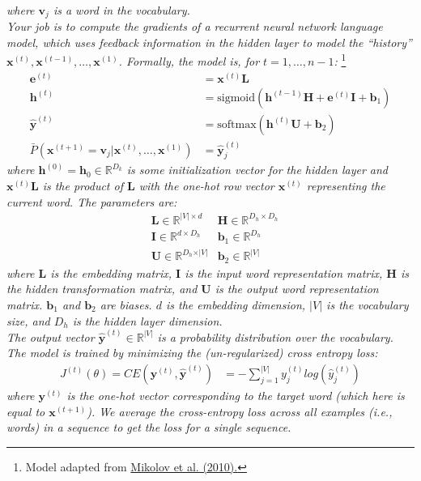 \documentclass[fleqn]{MJD}
\newcommand{\0}{\emptyset}
\begin{document}
\noindent \textit{where $\bm{v}_{j}$ is a word in the vocabulary.} \\

\noindent \textit{Your job is to compute the gradients of a recurrent neural network language model, which uses feedback information in the hidden layer to model the ``history'' $\bm{x}^{(t)}, \bm{x}^{(t-1)}, \dots, \bm{x}^{(1)}$. Formally, the model is, for $t = 1, \dots, n-1$:}%
\footnote{Model adapted from \hyperref{http://www.fit.vutbr.cz/research/groups/speech/publi/2010/mikolov_interspeech2010_IS100722.pdf}{}{}{Mikolov et al. (2010).}} %
%
\begin{align}
	\bm{e}^{(t)} &= \bm{x}^{(t)}\bm{L} \\
	\bm{h}^{(t)} &= \text{sigmoid} \left( \bm{h}^{(t-1)}\bm{H} + \bm{e}^{(t)}\bm{I} + \bm{b}_{1} \right)\\
	\hat{\bm{y}}^{(t)} &= \text{softmax}  \left( \bm{h}^{(t)}\bm{U} + \bm{b}_{2} \right) \\
	\bar{P}\left( \bm{x}^{(t+1)} = \bm{v}_{j} \vert \bm{x}^{(t)}, \dots, \bm{x}^{(1)} \right) &= \hat{\bm{y}}_{j}^{(t)}
\end{align}
%
\noindent \textit{where $\bm{h}^{(0)} = \bm{h}_{0} \in \mathbb{R}^{D_{k}}$ is some initialization vector for the hidden layer and $\bm{x}^{(t)}\bm{L}$ is the product of $\bm{L}$ with the one-hot row vector $\bm{x}^{(t)}$ representing the current word. The parameters are: }
%
\begin{align}
	&\bm{L} \in \mathbb{R}^{\vert V \vert \times d} 
	&\bm{H} \in \mathbb{R}^{D_{h} \times D_{h}} \\ 
	&\bm{I} \in \mathbb{R}^{d \times D_{h}} 
	&\bm{b}_{1} \in \mathbb{R}^{D_{h}} \\ 
	& \bm{U} \in \mathbb{R}^{D_{h} \times \vert V \vert} 
	& \bm{b}_{2} \in \mathbb{R}^{\vert V \vert} 
\end{align}
%
\noindent \textit{where $\bm{L}$ is the embedding matrix, $\bm{I}$ is the input word representation matrix, $\bm{H}$ is the hidden transformation matrix, and $\bm{U}$ is the output word representation matrix. $\bm{b}_{1}$ and $\bm{b}_{2}$ are biases. $d$ is the embedding dimension, $\vert V \vert$ is the vocabulary size, and $D_{h}$ is the hidden layer dimension.} \\

\noindent \textit{The output vector $\hat{\bm{y}}^{(t)} \in \mathbb{R}^{\vert V \vert}$ is a probability distribution over the vocabulary. The model is trained by minimizing the (un-regularized) cross entropy loss:}
%
\begin{align}
	J^{(t)}(\theta) = CE(\bm{y}^{(t)} , \hat{\bm{y}}^{(t)}) &= - \sum_{j=1}^{\vert V \vert} y_{j}^{(t)} log(\hat{y}_{j}^{(t)})
\end{align}
% 
\noindent \textit{where $\bm{y}^{(t)}$ is the one-hot vector corresponding to the target word (which here is equal to $\bm{x}^{(t+1)}$). We average the cross-entropy loss across all examples (i.e., words) in a sequence to get the loss for a single sequence.}
\end{document}
